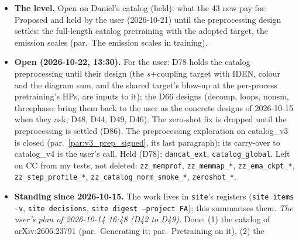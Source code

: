 \documentclass[11pt]{article}
\newcommand{\code}[1]{\texttt{#1}}
\begin{document}
\begin{itemize}
    against catalog\_v4 as it is and against the pp-trained arm, Muon, two seeds; optionally a half and half blend,
    about $3$ GPU-hours more). Its motivation, catalog\_v4 behind the pp-trained arm, came from the mismatched pp labels:
    on matching labels catalog\_v4 is ahead ($0.66$, par.~\ref{par:v4_vs_pp}) and the density correlates only weakly with
    the per-class ratio. On hold until the pp pools are regenerated with catalog\_v4's physics (massless $b$, every
    electroweak diagram, top at $172.5$\,GeV) and the comparison reread; whether to regenerate them is the user's call.
  \item \textbf{The level.} Open on Daniel's catalog (held): what the $43$ new pay for. Proposed and held by the user
    (2026-10-21) until the preprocessing design settles: the full-length catalog pretraining with the adopted target, the
    emission scales (par.\ The emission scales in training).
  \item \textbf{Open (2026-10-22, 13:30).} For the user: D78 holds the catalog preprocessing until their design (the
    $\hat s$+coupling target with IDEN, colour and the diagram sum, and the shared target's blow-up at the per-process
    pretraining's HPs, are inputs to it); the D66 designs (decomp, loops, nonsm, threephase: bring them back to the user
    as the concrete designs of 2026-10-15 when they ask; D48, D44, D49, D46). The zero-shot fix is dropped until the
    preprocessing is settled (D86). The preprocessing exploration on catalog\_v3 is closed (par.~\ref{par:v3_prep_signed},
    its last paragraph); its carry-over to catalog\_v4 is the user's call. Held (D78): \code{dancat\_ext},
    \code{catalog\_global}. Left on CC from my tests, not deleted: \code{zz\_memprof}, \code{zz\_memmap\_*},
    \code{zz\_ema\_ckpt\_*}, \code{zz\_step\_profile\_*}, \code{zz\_catalog\_norm\_smoke\_*}, \code{zeroshot\_*}.
  \item \textbf{Standing since 2026-10-15.} The work lives in \code{site}'s registers (\code{site items -v},
    \code{site decisions}, \code{site digest --project FA}); this summarises them. \emph{The user's plan of 2026-10-14
    16:48 (D42 to D49).} Done: (1) the catalog of arXiv:2606.23791 (par.\ Generating it; par.\ Pretraining on it), (2) the

\end{itemize}
\end{document}
